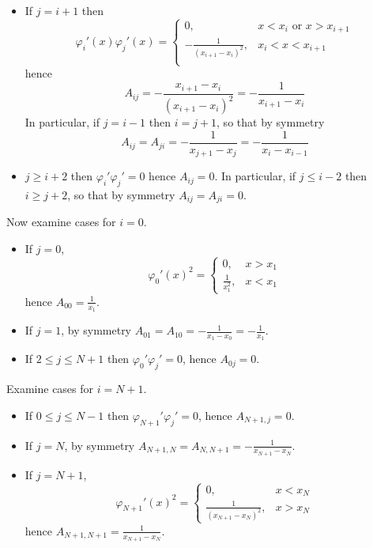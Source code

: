 \documentclass{article}
\newcommand{\vp}{\varphi}
\begin{document}
\begin{enumerate}
\begin{enumerate}
\begin{itemize}
		\item If $j=i+1$ then
		$$\vp_i'(x)\vp_j'(x) =
		\begin{cases}
			0, & x< x_i \text{ or } x> x_{i+1}\\
			-\frac{1}{(x_{i+1}-x_{i})^2}, & x_i<x<x_{i+1}\\
		\end{cases}$$
		hence
		$$A_{ij} = -\frac{x_{i+1}-x_i}{(x_{i+1}-x_{i})^2} = -\frac{1}{x_{i+1}-x_{i}}$$
		In particular, if $j=i-1$ then $i=j+1$, so that by symmetry
		$$A_{ij} = A_{ji} = -\frac{1}{x_{j+1}-x_j} = -\frac{1}{x_i-x_{i-1}}$$
		
		\item $j\ge i+2$ then $\vp_i'\vp_j'=0$ hence $A_{ij}=0$. In particular, if $j\le i-2$ then $i\ge j+2$, so that by symmetry $A_{ij}=A_{ji}=0$.
		
	\end{itemize}
	
	Now examine cases for $i=0$.
	\begin{itemize}
		
		\item If $j=0$,
		$$\vp_0'(x)^2 =
		\begin{cases}
			0, & x>x_1\\
			\frac{1}{x_1^2}, & x<x_1
		\end{cases}$$
		hence $A_{00}=\frac{1}{x_1}$.
		
		\item If $j=1$, by symmetry $A_{01} = A_{10} = -\frac{1}{x_1-x_0} = -\frac{1}{x_1}$.
		
		\item If $2\le j\le N+1$ then $\vp_0'\vp_j'=0$, hence $A_{0j}=0$.
		
	\end{itemize}
	
	Examine cases for $i=N+1$.
	\begin{itemize}
		
		\item If $0\le j\le N-1$ then $\vp_{N+1}'\vp_j'=0$, hence $A_{N+1,j}=0$.
		
		\item If $j=N$, by symmetry $A_{N+1,N} = A_{N,N+1} = -\frac{1}{x_{N+1}-x_N}$.
		
		\item If $j=N+1$,
		$$\vp_{N+1}'(x)^2 =
		\begin{cases}
			0, & x<x_N\\
			\frac{1}{(x_{N+1}-x_N)^2}, & x>x_N
		\end{cases}$$
		hence $A_{N+1,N+1}=\frac{1}{x_{N+1}-x_N}$.
		

\end{itemize}
\end{enumerate}
\end{enumerate}
\end{document}

